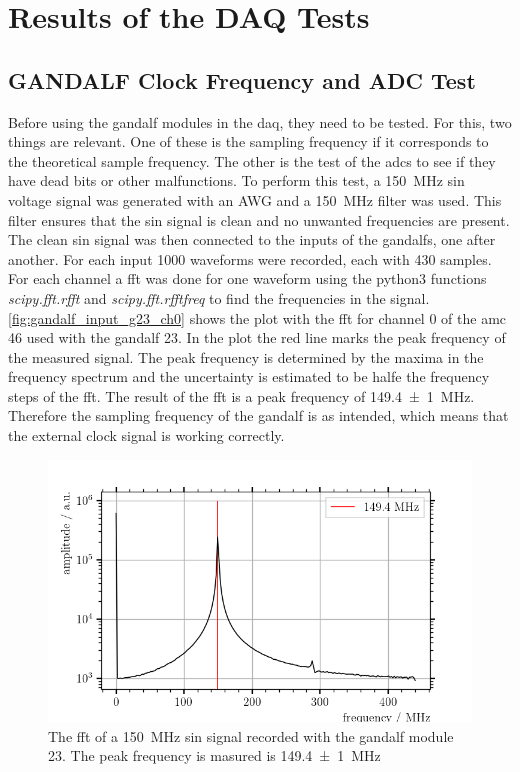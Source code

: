 \chapter{Results of the DAQ Tests}


\section{GANDALF Clock Frequency and ADC Test}
Before using the \ac{gandalf} modules in the \ac{daq}, they need to be tested.
For this, two things are relevant.
One of these is the sampling frequency if it corresponds to the theoretical sample frequency.
The other is the test of the \acp{adc} to see if they have dead bits or other malfunctions.
To perform this test, a \SI{150}{\mega\hertz} sin voltage signal was generated with an AWG and a \SI{150}{\mega\hertz} filter was used.
This filter ensures that the sin signal is clean and no unwanted frequencies are present.
The clean sin signal was then connected to the inputs of the \acp{gandalf}, one after another.
For each input \num{1000} waveforms were recorded, each with 430 samples.
For each channel a \ac{fft} was done for one waveform using the python3 functions \textit{scipy.fft.rfft} and \textit{scipy.fft.rfftfreq} to find the frequencies in the signal.
\autoref{fig:gandalf_input_g23_ch0} shows the plot with the \ac{fft} for channel 0 of the \ac{amc} 46 used with the \ac{gandalf} 23.
In the plot the red line marks the peak frequency of the measured signal.
The peak frequency is determined by the maxima in the frequency spectrum and the uncertainty is estimated to be halfe the frequency steps of the \ac{fft}.
The result of the \ac{fft} is a peak frequency of \SI{149.4(10)}{\mega\hertz}.
Therefore the sampling frequency of the \ac{gandalf} is as intended, which means that the external clock signal is working correctly.
\begin{figure}
	\centering
	\includegraphics[width=1.\textwidth]{pictures/gandalf_23_input_ch0}
	\caption[FFT of a \SI{150}{\mega\hertz} sin signal recorded with a GANDALF module.]{The \ac{fft} of a \SI{150}{\mega\hertz} sin signal recorded with the \ac{gandalf} module 23. The peak frequency is masured is \SI{149.4(10)}{\mega\hertz}}
	\label{fig:input_offset_b2_ch0}
\end{figure}



